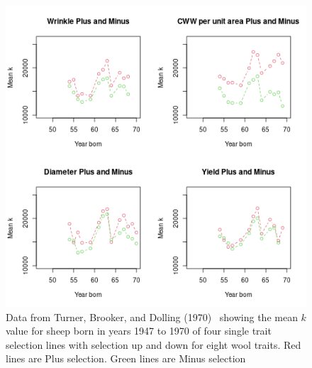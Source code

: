 %

\begin{figure}[h]
  \centering
   \includegraphics[width=1.4\textwidth,height=1.7\textwidth]{ab1fs/kfs3.png}
	\caption{Data from Turner, Brooker, and Dolling (1970)~\cite{turn:70} showing the mean $k$ value for sheep born in years 1947 to 1970  of four single trait selection lines with selection up and down for eight wool traits. Red lines are Plus selection. Green lines are Minus selection}
  \label{fig:kfs3}
\end{figure}

%

